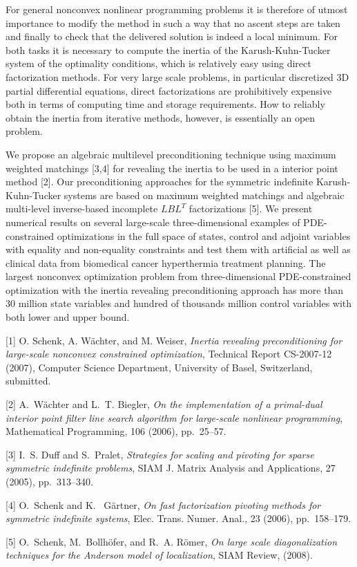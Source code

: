 \documentclass{report}
\begin{document}
For general nonconvex nonlinear programming problems it is therefore of
utmost importance to modify the method in such a way that no ascent steps
are taken and finally to check that the delivered solution is indeed a local
minimum. For both tasks it is necessary to compute the inertia of the
Karush-Kuhn-Tucker system of the optimality conditions, which is relatively
easy using direct factorization methods. For very large scale problems, in
particular discretized 3D partial differential equations, direct
factorizations are prohibitively expensive both in terms of computing time
and storage requirements. How to reliably obtain the inertia from iterative
methods, however, is essentially an open problem.

We propose an algebraic multilevel preconditioning technique using maximum
weighted matchings [3,4] for revealing the inertia to be used in a interior
point method [2]. Our preconditioning approaches for the symmetric
indefinite Karush-Kuhn-Tucker systems are based on maximum weighted
matchings and algebraic multi-level inverse-based incomplete $LBL^T$
factorizations [5]. We present numerical results on several large-scale
three-dimensional examples of PDE-constrained optimizations in the full
space of states, control and adjoint variables with equality and
non-equality constraints and test them with artificial as well as clinical
data from biomedical cancer hyperthermia treatment planning. The largest
nonconvex optimization problem from three-dimensional PDE-constrained
optimization with the inertia revealing preconditioning approach has more
than 30 million state variables and hundred of thousands million control
variables with both lower and upper bound.

[1] {\sc O. Schenk, A. W\"achter, and M. Weiser}, {\em Inertia revealing
preconditioning for large-scale nonconvex constrained optimization},
Technical Report CS-2007-12 (2007), Computer Science Department, University
of Basel, Switzerland, submitted.

[2] {\sc A.~W\"achter and L.~T. Biegler}, {\em On the implementation of a
primal-dual interior point filter line search algorithm for large-scale
nonlinear programming}, Mathematical Programming, 106 (2006), pp.~25--57.

[3] {\sc I.~S. Duff and S.~Pralet}, {\em Strategies for scaling and pivoting
for sparse symmetric indefinite problems}, SIAM J. Matrix Analysis and
Applications, 27 (2005), pp.~313--340.

[4] {\sc O.~Schenk and K. ~G\"artner}, {\em On fast factorization pivoting
methods for symmetric indefinite systems}, Elec. Trans. Numer. Anal., 23
(2006), pp.~158--179.

[5] {\sc O.~Schenk, M.~Bollh\"ofer, and R.~A. R\"omer}, {\em On large scale
diagonalization techniques for the {Anderson} model of localization}, SIAM
Review, (2008).
\end{document}
